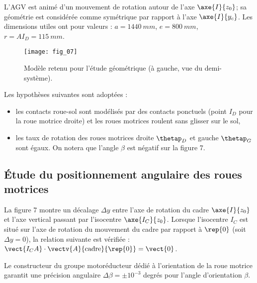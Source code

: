 L’AGV est animé d’un mouvement de rotation autour de l’axe $\axe{I}{z_0}$; sa géométrie est considérée
comme symétrique par rapport à l’axe $\axe{I}{y_c}$.
Les dimensions utiles ont pour valeurs : $a = \SI{1 440}{mm}$, $e = \SI{800}{mm}$, $r = AI_D = \SI{115}{mm}$.

\begin{figure}[!h]
\centering
\texttt{[image: fig\_07]}
\caption{\label{fig:07} Modèle retenu pour l’étude géométrique (à gauche, vue du demi-système).}
\end{figure}

Les hypothèses suivantes sont adoptées :
\begin{itemize}
\item les contacts roue-sol sont modélisés par des contacts ponctuels (point $I_D$ pour la roue motrice
droite) et les roues motrices roulent sans glisser sur le sol,
\item les taux de rotation des roues motrices droite $\thetap_D$ et gauche $\thetap_G$ sont égaux.
On notera que l’angle $\beta$ est négatif sur la figure 7.
\end{itemize}

\subsection*{Étude du positionnement angulaire des roues motrices}


La figure 7 montre un décalage $\Delta y$ entre l’axe de rotation du cadre $\axe{I}{z_0}$ et l’axe vertical passant par 
l’isocentre $\axe{I_C}{z_0}$. Lorsque l’isocentre $I_C$ est situé sur l’axe de rotation du mouvement du cadre par
rapport à $\rep{0}$ (soit $\Delta y = 0$), la relation suivante est vérifiée :  $\vect{I_C A}\cdot \vectv{A}{\text{cadre}}{\rep{0}}=\vect{0}$.


Le constructeur du groupe motoréducteur dédié à l’orientation de la roue motrice garantit une précision 
angulaire $\Delta \beta = \pm 10^{-3}$ degrés pour l’angle d’orientation $\beta$.

